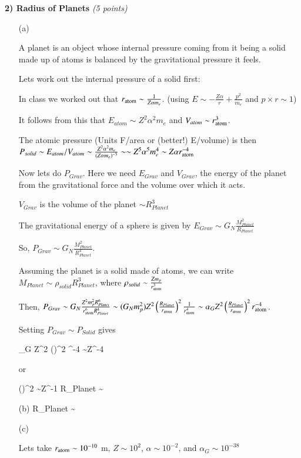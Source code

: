 {\large
\textbf{2) Radius of Planets } \hfill \textit{(5 points)}
\begin{itemize}
\item[(a)] {
A planet is an object whose internal pressure coming from it being a solid made up of atoms is balanced by the gravitational pressure it feels.

Lets work out the internal pressure of a solid first:

In class we worked out that $r_{\textrm{atom}} \sim \frac{1}{Z\alpha m_e}$. (using $E\sim - \frac{Z\alpha}{r} + \frac{p^2}{m_e}$ and $p\times r \sim 1$)

It follows from this that $E_{atom} \sim Z^2\alpha^2 m_e$ and $V_{atom} \sim r_{\textrm{atom}}^3$. 

The atomic pressure (Units F/area or (better!) E/volume) is then $P_{solid} \sim E_{atom} / V_{atom} \sim \frac{Z^2\alpha^2 m_e}{(Z\alpha m_e)^{-3}} \sim \sim Z^5\alpha^5 m_e^{4} \sim Z\alpha r_{\textrm{atom}}^{-4} $


Now lets do $P_{Grav}$. Here we need $E_{Grav}$ and $V_{Grav}$, the energy of the planet from the gravitational force and the volume over which it acts.

$V_{Grav}$ is the volume of the planet $\sim R_{Planet}^3$

The gravitational energy of a sphere is given by $E_{Grav} \sim G_N \frac{M_{Planet}^2}{R_{Planet}}$

So, $P_{Grav} \sim G_N \frac{M_{Planet}^2}{R_{Planet}^4}$. 

Assuming the planet is a solid made of atoms, we can write $M_{Planet} \sim \rho_{solid} R_{Planet}^3$, where $\rho_{solid} \sim \frac{Z m_p}{r_{\textrm{atom}}^3}$ 

Then, $P_{Grav} \sim G_N \frac{Z^2 m_p^2 R_{Planet}^6}{r_{\textrm{atom}}^6 R_{Planet}^4} \sim (G_N m_p^2) Z^2 \left(\frac{R_{Planet}}{r_{\textrm{atom}}}\right)^2 \frac{1}{r_{\textrm{atom}}^4} \sim \alpha_G Z^2 \left(\frac{R_{Planet}}{r_{\textrm{atom}}}\right)^2 r_{\textrm{atom}}^{-4} $. 

Setting $P_{Grav} \sim P_{Solid}$ gives

\be
\alpha_G Z^2 \left(\right)^2 \rAtom^{-4} \sim Z\alpha \rAtom^{-4}
\ee

or

\be
\left(\right)^2 \sim Z^{-1}   \Rightarrow R_{Planet} \sim  {} 
\ee


}
\item[(b)] {
\be
R_{Planet} \sim   {} \rAtom
\ee
}
\item[(c)] {
Lets take $r_{\textrm{atom}} \sim 10^{-10}$ m, $Z\sim10^2$, $\alpha \sim 10^{-2} $, and $\alpha_G \sim 10^{-38}$ 

}
\end{itemize}}
